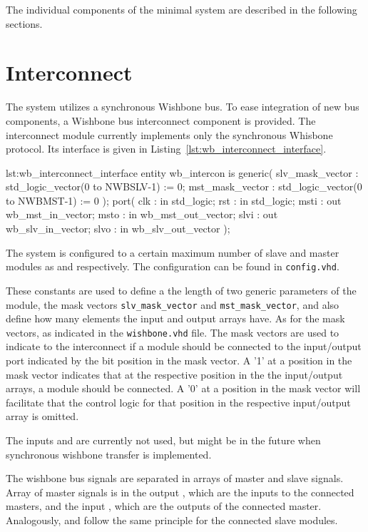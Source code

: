 The individual components of the minimal system are described in the following sections.

\section{Interconnect}
\label{chap:socarch:interconnect}
The system utilizes a synchronous Wishbone bus.
To ease integration of new bus components, a Wishbone bus interconnect component is provided.
The interconnect module currently implements only the synchronous Whisbone protocol.
Its interface is given in Listing~\ref{lst:wb_interconnect_interface}.

\begin{vhdl}{lst:wb_interconnect_interface}
entity wb_intercon is
generic(
  slv_mask_vector : std_logic_vector(0 to NWBSLV-1) := 0;
  mst_mask_vector : std_logic_vector(0 to NWBMST-1) := 0
);
port(
  clk  : in  std_logic;
  rst  : in  std_logic;
  msti : out wb_mst_in_vector;
  msto : in  wb_mst_out_vector;
  slvi : out wb_slv_in_vector;
  slvo : in  wb_slv_out_vector 
);
\end{vhdl}
The system is configured to a certain maximum number of slave and master modules as  and  respectively. 
The configuration can be found in \verb=config.vhd=.

These constants are used to define a the length of two generic parameters of the module,
the mask vectors \verb=slv_mask_vector= and \verb=mst_mask_vector=, 
and also define how many elements the input and output arrays have.
As for the mask vectors, as indicated in the \verb=wishbone.vhd= file.
The mask vectors are used to indicate to the interconnect if a module should be connected to the input/output port indicated by the bit position in the mask vector.
A '1' at a position in the mask vector indicates that at the respective position in the the input/output arrays, 
a module should be connected.
A '0' at a position in the mask vector will facilitate that the control logic for that position in the respective input/output array is omitted.

The inputs  and  are currently not used, but might be in the future when synchronous wishbone transfer is implemented.

The wishbone bus signals are separated in arrays of master and slave signals.
Array of master signals is in the output , which are the inputs to the connected masters, and the input , which are the outputs of the connected master.
Analogously,  and  follow the same principle for the connected slave modules.

